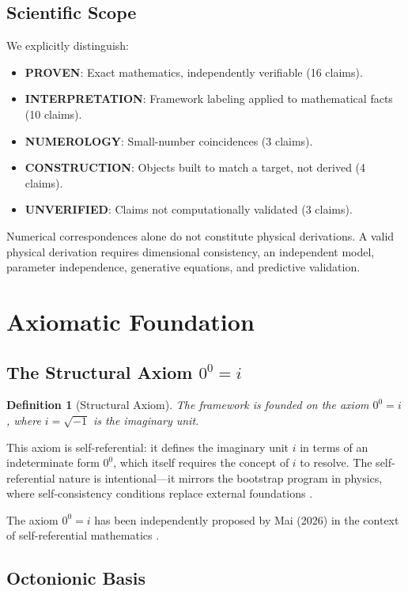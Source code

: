 \documentclass[11pt]{article}
\newtheorem{definition}{Definition}
\begin{document}
\subsection{Scientific Scope}

We explicitly distinguish:
\begin{itemize}
\item \textbf{PROVEN}: Exact mathematics, independently verifiable (16 claims).
\item \textbf{INTERPRETATION}: Framework labeling applied to mathematical facts (10 claims).
\item \textbf{NUMEROLOGY}: Small-number coincidences (3 claims).
\item \textbf{CONSTRUCTION}: Objects built to match a target, not derived (4 claims).
\item \textbf{UNVERIFIED}: Claims not computationally validated (3 claims).
\end{itemize}

Numerical correspondences alone do not constitute physical derivations. A valid physical derivation requires dimensional consistency, an independent model, parameter independence, generative equations, and predictive validation.

\section{Axiomatic Foundation}

\subsection{The Structural Axiom $0^0 = i$}

\begin{definition}[Structural Axiom]
The framework is founded on the axiom $0^0 = i$, where $i = \sqrt{-1}$ is the imaginary unit.
\end{definition}

This axiom is self-referential: it defines the imaginary unit $i$ in terms of an indeterminate form $0^0$, which itself requires the concept of $i$ to resolve. The self-referential nature is intentional---it mirrors the bootstrap program in physics, where self-consistency conditions replace external foundations \cite{chew1968bootstrap}.

The axiom $0^0 = i$ has been independently proposed by Mai (2026) in the context of self-referential mathematics \cite{mai2026selfreferential}.

\subsection{Octonionic Basis}
\end{document}
